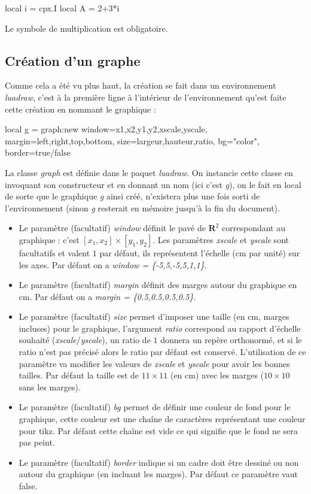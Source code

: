 \begin{Luacode}
local i = cpx.I
local A = 2+3*i
\end{Luacode}

Le symbole de multiplication est obligatoire.

\subsection{Création d'un graphe}

Comme cela a été vu plus haut, la création se fait dans un environnement \emph{luadraw}, c'est à la première ligne à l'intérieur de l'environnement qu'est faite cette création en nommant le graphique :

\begin{Luacode}
local g = graph:new{ window={x1,x2,y1,y2,xscale,yscale}, margin={left,right,top,bottom}, 
                     size={largeur,hauteur,ratio}, bg="color", border=true/false }
\end{Luacode}

La classe \emph{graph} est définie dans le paquet \emph{luadraw}. On instancie cette classe en invoquant son constructeur et en donnant un nom (ici c'est \emph{g}), on le fait en local de sorte que le graphique \emph{g} ainsi créé, n'existera plus une fois sorti de l'environnement (sinon \emph{g} resterait en mémoire jusqu'à la fin du document).

\begin{itemize}
 \item Le paramètre (facultatif) \emph{window} définit le pavé de $\mathbf R^2$ correspondant au graphique : c'est $[x_1,x_2]\times[y_1,y_2]$. Les paramètres \emph{xscale} et \emph{yscale} sont facultatifs et valent $1$ par défaut, ils représentent l'échelle (cm par unité) sur les axes. Par défaut on a \emph{window = \{-5,5,-5,5,1,1\}}.
\item Le paramètre (facultatif) \emph{margin} définit des marges autour du graphique en cm. Par défaut on a \emph{margin = \{0.5,0.5,0.5,0.5\}}.
\item Le paramètre (facultatif) \emph{size} permet d'imposer une taille (en cm, marges incluses) pour le graphique, l'argument \emph{ratio} correspond au rapport d'échelle souhaité (\emph{xscale}/\emph{yscale}), un ratio de $1$ donnera un repère orthonormé, et si le ratio n'est pas précisé alors le ratio par défaut est conservé. L'utilisation de ce paramètre va modifier les valeurs de \emph{xscale} et \emph{yscale} pour avoir les bonnes tailles. Par défaut la taille est de $11\times11$ (en cm) avec les marges ($10\times10$ sans les marges).
\item Le paramètre (facultatif) \emph{bg} permet de définir une couleur de fond pour le graphique, cette couleur est une chaîne de caractères représentant une couleur pour tikz. Par défaut cette chaîne est vide ce qui signifie que le fond ne sera pas peint.
\item Le paramètre (facultatif) \emph{border} indique si un cadre doit être dessiné ou non autour du graphique (en incluant les marges). Par défaut ce paramètre vaut false.
\end{itemize}


